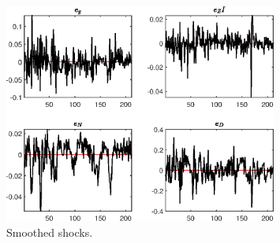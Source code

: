  
\begin{figure}[H]
\centering 
\includegraphics[width=0.80\textwidth]{BRS_growth_ext_fd_v1/graphs/BRS_growth_ext_fd_v1_SmoothedShocks1}
\caption{Smoothed shocks.}\label{Fig:SmoothedShocks:1}
\end{figure}


